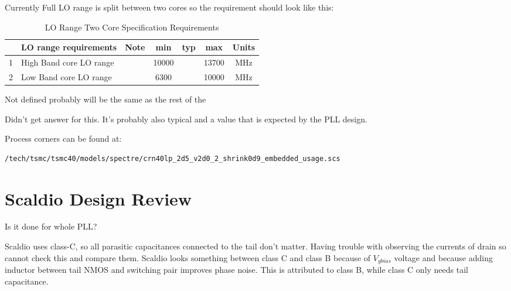 \documentclass{article}
\begin{document}
Currently Full LO range is split between two cores so the requirement should look like this:

\begin{table}[ht]
	\centering
	\begin{tabular}{|c|l|c|c|c|c|c|}
		\hline
		& LO range requirements & Note & min & typ & max & Units \\
		\hline
		1 & High Band core LO range &  & 10000  &  & 13700 & MHz \\ 
		\hline
		2 & Low Band core LO range &  & 6300 &  & 10000 & MHz \\ 
		\hline
	\end{tabular}
	\caption{LO Range Two Core Specification Requirements} 
\end{table}

\begin{question}
	Not defined probably will be the same as the rest of the 
\end{question}


\begin{question}
	Didn't get answer for this. It's probably also typical and a value that is expected by the PLL design.
\end{question}


Process corners can be found at:

\begin{verbatim}
/tech/tsmc/tsmc40/models/spectre/crn40lp_2d5_v2d0_2_shrink0d9_embedded_usage.scs
\end{verbatim}

\section{Scaldio Design Review}

\begin{question}
Is it done for whole PLL?
\end{question}

\begin{question}
	Scaldio uses class-C, so all parasitic capacitances connected to the tail don't matter. Having trouble with observing the currents of drain so cannot check this and compare them. Scaldio looks something between class C and class B because of $V_{gbias}$ voltage and because adding inductor between tail NMOS and switching pair improves phase noise. This is attributed to class B, while class C only needs tail capacitance.
\end{question}
\end{document}
